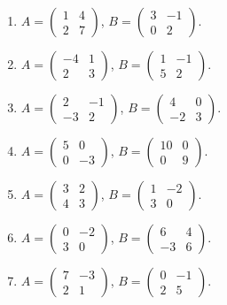 \begin{enumerate}[label=\arabic*.,  leftmargin=*]
\item $A=\begin{pmatrix}1&4\\2&7\end{pmatrix}$, $B=\begin{pmatrix}3&-1\\0&2\end{pmatrix}$.
\item $A=\begin{pmatrix}-4&1\\2&3\end{pmatrix}$, $B=\begin{pmatrix}1&-1\\5&2\end{pmatrix}$.
\item $A=\begin{pmatrix}2&-1\\-3&2\end{pmatrix}$, $B=\begin{pmatrix}4&0\\-2&3\end{pmatrix}$.
\item $A=\begin{pmatrix}5&0\\0&-3\end{pmatrix}$, $B=\begin{pmatrix}10&0\\0&9\end{pmatrix}$.
\item $A=\begin{pmatrix}3&2\\4&3\end{pmatrix}$, $B=\begin{pmatrix}1&-2\\3&0\end{pmatrix}$.
\item $A=\begin{pmatrix}0&-2\\3&0\end{pmatrix}$, $B=\begin{pmatrix}6&4\\-3&6\end{pmatrix}$.
\item $A=\begin{pmatrix}7&-3\\2&1\end{pmatrix}$, $B=\begin{pmatrix}0&-1\\2&5\end{pmatrix}$.

\end{enumerate}
